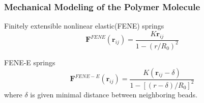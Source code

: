 
\begin{frame}
  \frametitle{Mechanical Modeling of the Polymer Molecule}
Finitely extensible nonlinear elastic(FENE) springs
\begin{equation}\label{equ:fene}
 \mathbf{F}^{FENE}(\mathbf{r}_{ij})=\frac{K\mathbf{r}_{ij}}{1-(r/R_0)^2}
\end{equation}

FENE-E springs
  \begin{equation}\label{equ:feneE}
 \mathbf{F}^{FENE-E}(\mathbf{r}_{ij})=\frac{K(\mathbf{r}_{ij}-\delta)}{1-[(r-\delta)/R_0]^2}
\end{equation}
where $\delta$ is given minimal distance between neighboring beads.
\end{frame}

